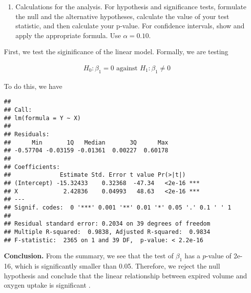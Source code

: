 \documentclass[12pt,]{article}
\newenvironment{Shaded}{\begin{snugshade}}{\end{snugshade}}
\newcommand{\KeywordTok}[1]{\textcolor[rgb]{0.13,0.29,0.53}{\textbf{#1}}}
\newcommand{\StringTok}[1]{\textcolor[rgb]{0.31,0.60,0.02}{#1}}
\newcommand{\OperatorTok}[1]{\textcolor[rgb]{0.81,0.36,0.00}{\textbf{#1}}}
\newcommand{\NormalTok}[1]{#1}
\providecommand{\tightlist}{%
  \setlength{\itemsep}{0pt}\setlength{\parskip}{0pt}}
\begin{document}
\begin{enumerate}
\def\labelenumi{\alph{enumi})}
\setcounter{enumi}{2}
\tightlist
\item
  Calculations for the analysis. For hypothesis and significance tests,
  formulate the null and the alternative hypotheses, calculate the value
  of your test statistic, and then calculate your p-value. For
  confidence intervals, show and apply the appropriate formula. Use
  \(\alpha=0.10\).
\end{enumerate}

First, we test the siginificance of the linear model. Formally, we are
testing

\begin{align}
H_0: \beta_1 = 0 \text{ against } H_1: \beta_1\neq 0
\end{align}

To do this, we have

\begin{Shaded}
\end{Shaded}

\begin{verbatim}
## 
## Call:
## lm(formula = Y ~ X)
## 
## Residuals:
##      Min       1Q   Median       3Q      Max 
## -0.57704 -0.03159 -0.01361  0.00227  0.60178 
## 
## Coefficients:
##              Estimate Std. Error t value Pr(>|t|)    
## (Intercept) -15.32433    0.32368  -47.34   <2e-16 ***
## X             2.42836    0.04993   48.63   <2e-16 ***
## ---
## Signif. codes:  0 '***' 0.001 '**' 0.01 '*' 0.05 '.' 0.1 ' ' 1
## 
## Residual standard error: 0.2034 on 39 degrees of freedom
## Multiple R-squared:  0.9838, Adjusted R-squared:  0.9834 
## F-statistic:  2365 on 1 and 39 DF,  p-value: < 2.2e-16
\end{verbatim}

\textbf{Conclusion.} From the summary, we see that the test of
\(\beta_1\) has a \(p\)-value of 2e-16, which is significantly smaller
than 0.05. Therefore, we reject the null hypothesis and conclude that
the linear relationship between expired volume and oxygen uptake is
significant .
\end{document}
